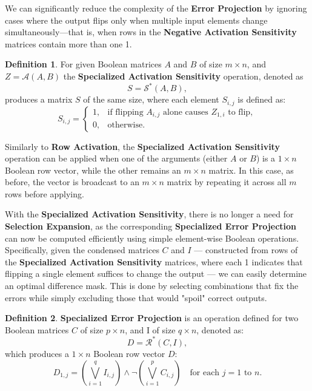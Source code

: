 \documentclass{article}
\theoremstyle{definition}
\newtheorem*{definition}{Definition}
\theoremstyle{remark}
\begin{document}
We can significantly reduce the complexity of the \textbf{Error Projection} by ignoring cases where the output flips only when multiple input elements change simultaneously—that is, when rows in the \textbf{Negative Activation Sensitivity} matrices contain more than one 1.

\begin{definition}
    For given Boolean matrices \( A \) and \( B \) of size \( m \times n \), and \( Z = \mathcal{A}(A, B) \) the \textbf{Specialized Activation Sensitivity} operation, denoted as
    \[
        S = \mathcal{S}^*(A, B),
    \]
    produces a matrix \( S \) of the same size, where each element \( S_{i,j} \) is defined as:
    \[
        S_{i,j} =
        \begin{cases}
            1, & \text{if flipping } A_{i,j} \text{ alone causes } Z_{1,i} \text{ to flip}, \\
            0, & \text{otherwise}.
        \end{cases}
    \]

    Similarly to \textbf{Row Activation}, the \textbf{Specialized Activation Sensitivity} operation can be applied when one of the arguments (either \( A \) or \( B \)) is a \( 1 \times n \) Boolean row vector, while the other remains an \( m \times n \) matrix. In this case, as before, the vector is broadcast to an \( m \times n \) matrix by repeating it across all \( m \) rows before applying.
\end{definition}

With the \textbf{Specialized Activation Sensitivity}, there is no longer a need for \textbf{Selection Expansion}, as the corresponding \textbf{Specialized Error Projection} can now be computed efficiently using simple element-wise Boolean operations. Specifically, given the condensed matrices \( C \) and \( I \) — constructed from rows of the \textbf{Specialized Activation Sensitivity} matrices, where each 1 indicates that flipping a single element suffices to change the output — we can easily determine an optimal difference mask. This is done by selecting combinations that fix the errors while simply excluding those that would "spoil" correct outputs.

\begin{definition}
    \textbf{Specialized Error Projection} is an operation defined for two Boolean matrices \( C \) of size \( p \times n \), and I of size \( q \times n \), denoted as:
    \[
        D = \mathcal{R}^*(C, I),
    \]
    which produces a \( 1 \times n \) Boolean row vector \( D \):
    \[
        D_{1,j} = \left( \bigvee_{i=1}^{q} I_{i,j} \right) \wedge \neg \left( \bigvee_{i=1}^{p} C_{i,j} \right) \quad \text{for each } j = 1 \text{ to } n.
    \]
\end{definition}
\end{document}
